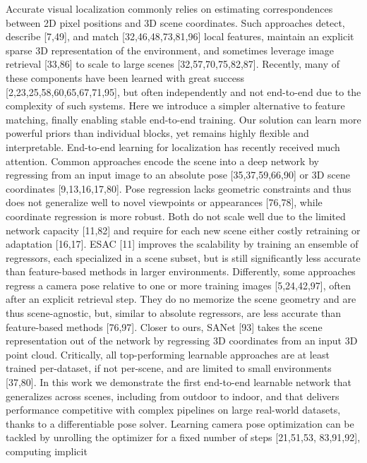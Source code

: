 \documentclass[twocolumn]{article} %
\begin{document}
Accurate visual localization commonly relies on estimating
correspondences between 2D pixel positions and 3D scene coordinates.
Such approaches detect, describe {[}7,49{]}, and match
{[}32,46,48,73,81,96{]} local features, maintain an explicit sparse 3D
representation of the environment, and sometimes leverage image
retrieval {[}33,86{]} to scale to large scenes {[}32,57,70,75,82,87{]}.
Recently, many of these components have been learned with great success
{[}2,23,25,58,60,65,67,71,95{]}, but often independently and not
end-to-end due to the complexity of such systems. Here we introduce a
simpler alternative to feature matching, finally enabling stable
end-to-end training. Our solution can learn more powerful priors than
individual blocks, yet remains highly flexible and interpretable.
End-to-end learning for localization has recently received much
attention. Common approaches encode the scene into a deep network by
regressing from an input image to an absolute pose {[}35,37,59,66,90{]}
or 3D scene coordinates {[}9,13,16,17,80{]}. Pose regression lacks
geometric constraints and thus does not generalize well to novel
viewpoints or appearances {[}76,78{]}, while coordinate regression is
more robust. Both do not scale well due to the limited network capacity
{[}11,82{]} and require for each new scene either costly retraining or
adaptation {[}16,17{]}. ESAC {[}11{]} improves the scalability by
training an ensemble of regressors, each specialized in a scene subset,
but is still significantly less accurate than feature-based methods in
larger environments. Differently, some approaches regress a camera pose
relative to one or more training images {[}5,24,42,97{]}, often after an
explicit retrieval step. They do no memorize the scene geometry and are
thus scene-agnostic, but, similar to absolute regressors, are less
accurate than feature-based methods {[}76,97{]}. Closer to ours, SANet
{[}93{]} takes the scene representation out of the network by regressing
3D coordinates from an input 3D point cloud. Critically, all
top-performing learnable approaches are at least trained per-dataset, if
not per-scene, and are limited to small environments {[}37,80{]}. In
this work we demonstrate the first end-to-end learnable network that
generalizes across scenes, including from outdoor to indoor, and that
delivers performance competitive with complex pipelines on large
real-world datasets, thanks to a differentiable pose solver. Learning
camera pose optimization can be tackled by unrolling the optimizer for a
fixed number of steps {[}21,51,53, 83,91,92{]}, computing implicit
\end{document}
